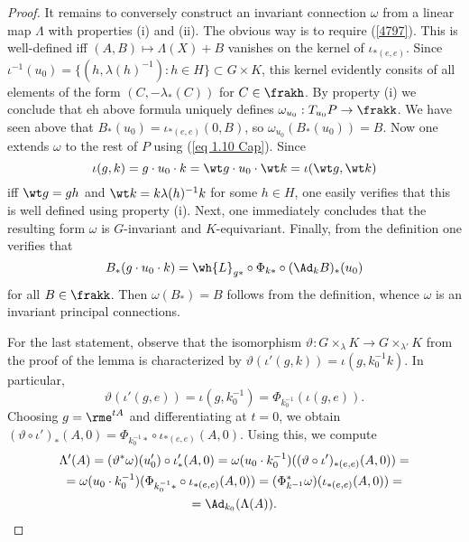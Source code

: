 \begin{proof}
    It remains to conversely construct an invariant connection $\omega$ from a linear map $\Lambda$ with properties (i) and (ii). The obvious way is to require (\ref{4797}). This is well-defined iff $(A,B)\mapsto \Lambda(X)+B$ vanishes on the kernel of $\iota_{\ast(e,e)}$. Since $\iota^{-1}(u_0)=\{(h,\lambda(h)^{-1}):h\in H\}\subset G\times K$, this kernel evidently consits of all elements of the form $(C,-\lambda_\ast(C))$ for $C\in \frakh$. By property (i) we conclude that eh above formula uniquely defines $\omega_{u_0}:T_{u_0}P\to \frakk$. We have seen above that $B_\ast(u_0)=\iota_{\ast(e,e)}(0,B)$, so $\omega_{u_0}(B_\ast(u_0))=B$. Now one extends $\omega$ to the rest of $P$ using (\ref{eq 1.10 Cap}). Since 
    \[\iota(g,k)=g\cdot u_0\cdot k=\wt g\cdot u_0\cdot \wt k=\iota(\wt g,\wt k)\]
    iff $\wt g=gh$ and $\wt k =k\lambda(h)^{-1}k$ for some $h\in H$, one easily verifies that this is well defined using property (i). Next, one immediately concludes that the resulting form $\omega$ is $G$-invariant and $K$-equivariant. Finally, from the definition one verifies that 
    \[B_\ast(g\cdot u_0\cdot k)=\wh{L}_{g\ast}\circ \Phi_{k\ast}\circ (\Ad_k B)_\ast(u_0)\]
    for all $B\in\frakk$. Then $\omega(B_\ast)=B$ follows from the definition, whence $\omega$ is an invariant principal connections.

    For the last statement, observe that the isomorphism $\vartheta:G\times_\lambda K\to G\times_{\lambda '}K$ from the proof of the lemma is characterized by $\vartheta(\iota'(g,k))=\iota(g,k_0^{-1}k)$. In particular, 
    \[\vartheta(\iota'(g,e))=\iota(g,k_0^{-1})=\Phi_{k_0^{-1}}(\iota(g,e)).\]
    Choosing $g=\rme^{tA}$ and differentiating at $t=0$, we obtain $(\vartheta\circ \iota')_\ast(A,0)=\Phi_{k_0^{-1}\ast}\circ \iota_{\ast(e,e)}(A,0)$. Using this, we compute 
    \begin{multline}
        \Lambda'(A)=(\vartheta^\ast \omega)(u_0')\circ \iota'_\ast(A,0)=\omega(u_0\cdot k_0^{-1})((\vartheta\circ \iota')_{\ast(e,e)}(A,0))=\\
        =\omega(u_0\cdot k_0^{-1})(\Phi_{k_0^{-1}\ast}\circ \iota_{\ast(e,e)}(A,0))=(\Phi_{k^{-1}}^\ast\omega)(\iota_{\ast(e,e)}(A,0))=\\
        =\Ad_{k_0}(\Lambda(A)).
    \end{multline}
\end{proof}

